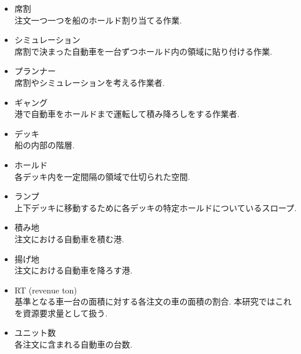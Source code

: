 \documentclass[a4j,11pt,twocolumn]{jsarticle}
\begin{document}
\begin{itemize}

\item 席割 \\
注文一つ一つを船のホールド割り当てる作業.

\item シミュレーション \\
席割で決まった自動車を一台ずつホールド内の領域に貼り付ける作業.

\item  プランナー \\
席割やシミュレーションを考える作業者.

\item  ギャング\\
港で自動車をホールドまで運転して積み降ろしをする作業者.

\item デッキ \\
船の内部の階層.

\item ホールド \\
各デッキ内を一定間隔の領域で仕切られた空間.

\item ランプ \\
上下デッキに移動するために各デッキの特定ホールドについているスロープ.


\item 積み地 \\
注文における自動車を積む港.

\item 揚げ地 \\
注文における自動車を降ろす港.

\item  RT (revenue ton) \\
基準となる車一台の面積に対する各注文の車の面積の割合. 本研究ではこれを資源要求量として扱う\cite{stowage}.

\item ユニット数 \\
各注文に含まれる自動車の台数.

\end{itemize}
\end{document}
